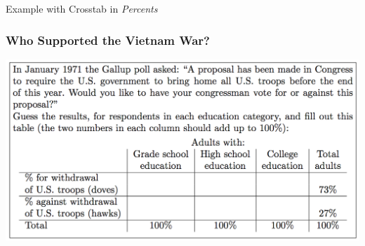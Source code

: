 \documentclass[handout]{beamer}
\begin{document}
\begin{frame}

\vspace{3em}
\huge \centering Example with Crosstab in \emph{Percents}



\end{frame}




\begin{frame}
\frametitle{Who Supported the Vietnam War?}
\begin{center}
\includegraphics[scale = 0.27]{./images/vietnam_question}
\end{center}



\end{frame}
\end{document}

